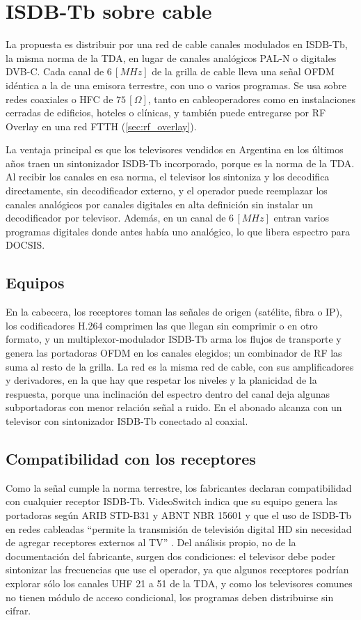 \section{ISDB-Tb sobre cable}
\label{sec:isdbtb_cable}

La propuesta es distribuir por una red de cable canales modulados en ISDB-Tb, la misma norma de la TDA, en lugar de canales analógicos PAL-N o digitales DVB-C. Cada canal de $6 \, [MHz]$ de la grilla de cable lleva una señal OFDM idéntica a la de una emisora terrestre, con uno o varios programas. Se usa sobre redes coaxiales o HFC de $75 \, [\Omega]$, tanto en cableoperadores como en instalaciones cerradas de edificios, hoteles o clínicas, y también puede entregarse por RF Overlay en una red FTTH (\autoref{sec:rf_overlay}).

La ventaja principal es que los televisores vendidos en Argentina en los últimos años traen un sintonizador ISDB-Tb incorporado, porque es la norma de la TDA. Al recibir los canales en esa norma, el televisor los sintoniza y los decodifica directamente, sin decodificador externo, y el operador puede reemplazar los canales analógicos por canales digitales en alta definición sin instalar un decodificador por televisor. Además, en un canal de $6 \, [MHz]$ entran varios programas digitales donde antes había uno analógico, lo que libera espectro para DOCSIS.

\subsection{Equipos}
En la cabecera, los receptores toman las señales de origen (satélite, fibra o IP), los codificadores H.264 comprimen las que llegan sin comprimir o en otro formato, y un multiplexor-modulador ISDB-Tb arma los flujos de transporte y genera las portadoras OFDM en los canales elegidos; un combinador de RF las suma al resto de la grilla. La red es la misma red de cable, con sus amplificadores y derivadores, en la que hay que respetar los niveles y la planicidad de la respuesta, porque una inclinación del espectro dentro del canal deja algunas subportadoras con menor relación señal a ruido. En el abonado alcanza con un televisor con sintonizador ISDB-Tb conectado al coaxial.

\subsection{Compatibilidad con los receptores}
Como la señal cumple la norma terrestre, los fabricantes declaran compatibilidad con cualquier receptor ISDB-Tb. VideoSwitch indica que su equipo genera las portadoras según ARIB STD-B31 y ABNT NBR 15601 y que el uso de ISDB-Tb en redes cableadas ``permite la transmisión de televisión digital HD sin necesidad de agregar receptores externos al TV'' \cite{videoswitch_dmm}. Del análisis propio, no de la documentación del fabricante, surgen dos condiciones: el televisor debe poder sintonizar las frecuencias que use el operador, ya que algunos receptores podrían explorar sólo los canales UHF 21 a 51 de la TDA, y como los televisores comunes no tienen módulo de acceso condicional, los programas deben distribuirse sin cifrar.

